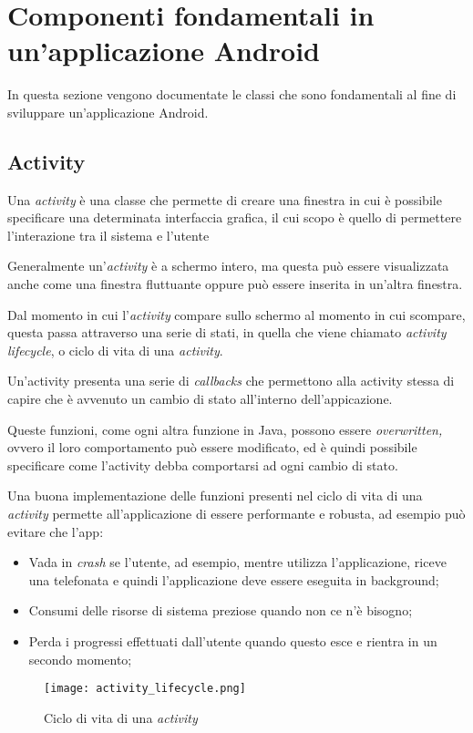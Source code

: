 \hypertarget{concetti-fondamentali-di-unapplicazione-android}{%
\section{Componenti fondamentali in un'applicazione Android}\label{concetti-fondamentali-di-unapplicazione-android}}

In questa sezione vengono documentate le classi che sono fondamentali al fine di sviluppare un'applicazione Android.

\hypertarget{activity}{%
\subsection{Activity}\label{activity}}

Una \emph{activity} è una classe che permette di creare una finestra in cui è possibile specificare una determinata interfaccia grafica, il cui scopo è quello di permettere l’interazione tra il sistema e l’utente

Generalmente un'\emph{activity} è a schermo intero, ma questa può essere visualizzata anche come una finestra fluttuante oppure può essere inserita in un'altra finestra. \cite{activity}

Dal momento in cui l'\emph{activity} compare sullo schermo al momento in cui scompare, questa passa attraverso una serie di stati, in quella che viene chiamato \emph{activity lifecycle}, o ciclo di vita di una
\emph{activity}.

Un'activity presenta una serie di \emph{callbacks} che permettono alla activity stessa di capire che è avvenuto un cambio di stato all'interno dell'appicazione.

Queste funzioni, come ogni altra funzione in Java, possono essere
\emph{overwritten,} ovvero il loro comportamento può essere modificato, ed è quindi possibile specificare come l'activity debba comportarsi ad ogni cambio di stato. \cite{activity-lifecycle}

Una buona implementazione delle funzioni presenti nel ciclo di vita di una \emph{activity} permette all'applicazione di essere performante e robusta, ad esempio può evitare che l'app:

\begin{itemize}
    \item Vada in \emph{crash} se l'utente, ad esempio, mentre utilizza l'applicazione, riceve una telefonata e quindi l'applicazione deve essere eseguita in background;
    \item Consumi delle risorse di sistema preziose quando non ce n'è bisogno;
    \item Perda i progressi effettuati dall'utente quando questo esce e rientra in un secondo momento;
\end{itemize}
\begin{figure}[H]
\centering
\texttt{[image: activity\_lifecycle.png]}
\caption{Ciclo di vita di una \emph{activity}}
\end{figure}


